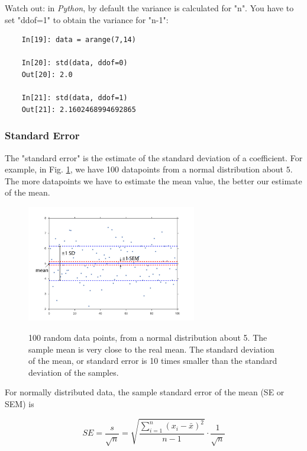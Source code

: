 Watch out: in \emph{Python}, by default the variance is calculated for "n". You have to set "ddof=1" to obtain the variance for "n-1":

\begin{lstlisting}
    In[19]: data = arange(7,14)

    In[20]: std(data, ddof=0)
    Out[20]: 2.0

    In[21]: std(data, ddof=1)
    Out[21]: 2.1602468994692865
\end{lstlisting}

\subsubsection{Standard Error} 

The "standard error" is the estimate of the standard deviation of a coefficient. For example, in Fig. \ref{fig:sem}, we have 100 datapoints from a normal distribution about $5$. The more datapoints we have to estimate the mean value, the better our estimate of the mean. 

\begin{figure}[ht]
  \centering
  \includegraphics[width=0.66\textwidth]{../Images/standardError.jpg}\\
  \caption{100 random data points, from a normal distribution about 5. The sample mean is very close to the real mean. The standard deviation of the mean, or standard error is 10 times smaller than the standard deviation of the samples.}
  \label{fig:sem}
\end{figure}

For normally distributed data, the sample standard error of the mean (SE or SEM) is

\begin{equation}
  SE = \frac{s}{\sqrt{n}} = \sqrt{\frac{{\sum\limits_{i = 1}^n {({x_i-\bar{x}})^2} }}{n-1}} \cdot \frac{1}{\sqrt{n}}
\end{equation}

